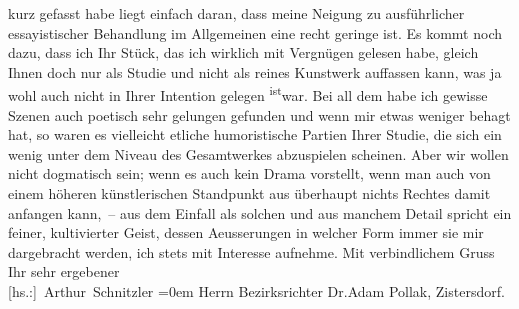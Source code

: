 \begin{ledgroupsized}[t]{13cm}
               kurz gefasst habe liegt einfach daran, dass meine Neigung zu ausführlicher
               essayistischer Behandlung im Allgemeinen eine recht geringe ist. Es kommt noch dazu,
               dass ich Ihr Stück, das ich
               wirklich mit Vergnügen gelesen habe, gleich Ihnen doch nur als Studie und nicht als
               reines Kunstwerk auffassen kann, was ja wohl auch nicht in Ihrer Intention gelegen \substVorne{}\textsuperscript{ist}\substDazwischen{}war\substHinten{}. Bei all dem habe ich gewisse Szenen auch poetisch sehr gelungen gefunden
               und wenn mir etwas weniger behagt hat, so waren es vielleicht etliche humoristische
               Partien Ihrer Studie, die sich ein wenig unter dem Niveau des Gesamtwerkes abzuspielen scheinen. Aber wir
               wollen nicht dogmatisch sein; wenn {\pb}es auch kein Drama  vorstellt, wenn man auch von einem höheren
               künstlerischen Standpunkt aus überhaupt nichts Rechtes damit anfangen kann, – aus dem
               Einfall als solchen und aus manchem Detail spricht ein feiner, kultivierter Geist,
               dessen Aeusserungen in welcher Form immer sie mir dargebracht werden, ich \introOben{}stets\introOben{} mit Interesse aufnehme.\pend
           \pstart
           Mit verbindlichem Gruss{\\[\baselineskip]}Ihr sehr ergebener{\\[\baselineskip]}\spacefill\mbox{{[}hs.:{]} Arthur Schnitzler}\pend
           \leftskip=0em{}\pstart
           \noindent{}Herrn Bezirksrichter Dr.Adam Pollak, Zistersdorf.\pend
           
         
         \endnumbering{}\end{ledgroupsized}  \newcommand{\dateiname}{L02137}\newcommand{\titel}{Arthur Schnitzler an Robert Adam, 13. 5. 1913}\newcommand{\editorInnen}{Martin Anton Müller und Gerd-Hermann Susen}
      